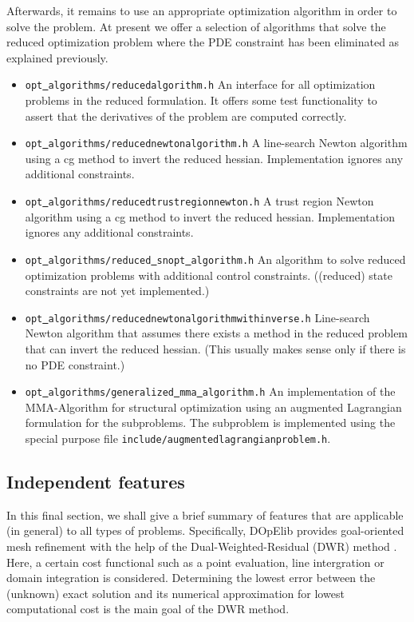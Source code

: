 \documentclass[prodmode,acmtoms]{acmsmall}
\numberwithin{equation}{section}
\begin{document}
Afterwards, it remains to use an appropriate 
optimization algorithm in order to solve the 
problem. At present we offer a selection of algorithms that solve the reduced optimization 
problem where the PDE constraint has been eliminated as explained previously.
\begin{itemize}
\item \texttt{opt\underline{ }algorithms/reducedalgorithm.h} An interface for all 
  optimization problems in the reduced formulation. It offers some test functionality
  to assert that the derivatives of the problem are computed correctly.
\item \texttt{opt\underline{ }algorithms/reducednewtonalgorithm.h}
  A line-search Newton algorithm using a cg method to invert the reduced hessian. 
  Implementation ignores any additional constraints.
\item \texttt{opt\underline{ }algorithms/reducedtrustregionnewton.h}
  A trust region Newton algorithm using a cg method to invert the reduced hessian.
  Implementation ignores any additional constraints.
\item \texttt{opt\underline{ }algorithms/reduced\underline{ }snopt\underline{ }algorithm.h}
  An algorithm to solve reduced optimization problems with additional control constraints.
  ((reduced) state constraints are not yet implemented.)
\item \texttt{opt\underline{ }algorithms/reducednewtonalgorithmwithinverse.h}
  Line-search Newton algorithm that assumes there exists a method in the reduced problem
  that can invert the reduced hessian. (This usually makes sense only if there is no 
  PDE constraint.)
\item \texttt{opt\underline{ }algorithms/generalized\underline{ }mma\underline{ }algorithm.h}
  An implementation of the MMA-Algorithm for structural optimization using an augmented
  Lagrangian formulation for the subproblems. The subproblem is implemented using the 
  special purpose file
  \texttt{include/augmentedlagrangianproblem.h}.
\end{itemize} 




\subsection{Independent features}
In this final section, we shall give a brief summary of features 
that are applicable (in general) to all types of problems. Specifically,
DOpElib provides goal-oriented mesh refinement with the help of the 
Dual-Weighted-Residual (DWR) method \cite{BeRa96}. Here, a certain 
cost functional such as a point evaluation, line intergration or domain
integration is considered. Determining the lowest error between the 
(unknown) exact solution and its numerical approximation for lowest computational
cost is the main goal of the DWR method.
\end{document}
